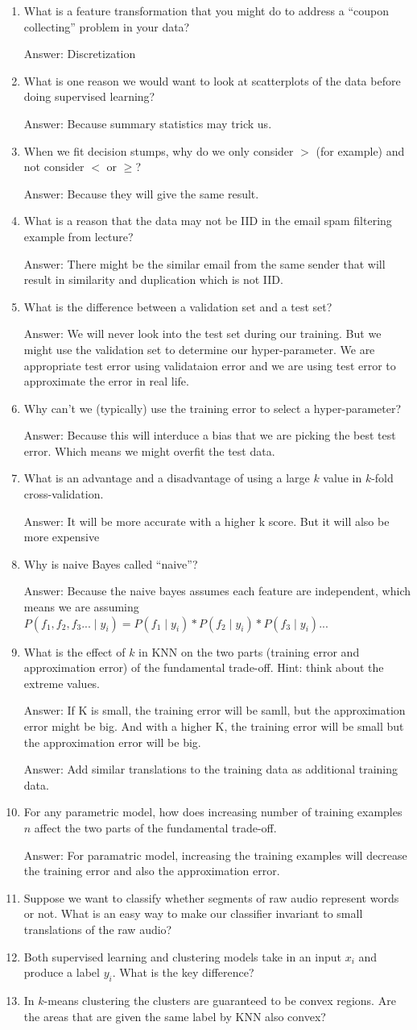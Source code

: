 \documentclass{article}
\def\ans#1{\par\gre{Answer: #1}}
\def\gre#1{{\color{gre}#1}}
\def\cond{\; | \;}
\def\enum#1{\begin{enumerate}#1\end{enumerate}}
\begin{document}
\enum{
 \item What is a feature transformation that you might do to address a ``coupon collecting'' problem in your data? \ans{Discretization}
\item What is one reason we would want to look at scatterplots of the data before doing supervised learning? \ans{Because summary statistics may trick us.}
 \item When we fit decision stumps, why do we only consider $>$ (for example) and not consider $<$ or $\geq$? \ans{Because they will give the same result.}
\item What is a reason that the data may not be IID in the email spam filtering example from lecture? \ans{There might be the similar email from the same sender that will result in similarity and duplication which is not IID.}
\item What is the difference between a validation set and a test set? \ans{We will never look into the test set during our training. But we might use the validation set to determine our hyper-parameter. We are appropriate test error using validataion error and we are using test error to approximate the error in real life.}
\item Why can't we (typically) use the training error to select a hyper-parameter? \ans{Because this will interduce a bias that we are picking the best test error. Which means we might overfit the test data. }
\item What is an advantage and a disadvantage of using a large $k$ value in $k$-fold cross-validation. \ans{It will be more accurate with a higher k score. But it will also be more expensive}
\item Why is  naive Bayes called ``naive''? \ans{Because the naive bayes assumes each feature are independent, which means we are assuming $P(f_1,f_2,f_3 ... \cond y_i) = P(f_1\cond y_i)*P(f_2\cond y_i)*P(f_3\cond y_i)...$}
\item What is the effect of $k$ in KNN on the two parts (training error and approximation error) of the fundamental trade-off. Hint: think about the extreme values. \ans{If K is small, the training error will be samll, but the approximation error might be big. And with a higher K, the training error will be small but the approximation error will be big.} \ans{Add similar translations to the training data as additional training data.}
\item For any parametric model, how does increasing number of training examples $n$ affect the two parts of the fundamental trade-off. \ans{For paramatric model, increasing the training examples will decrease the training error and also the approximation error.}
\item Suppose we want to classify whether segments of raw audio represent words or not. What is an easy way to make our classifier invariant to small translations of the raw audio?
\item Both supervised learning and clustering models take in an input $x_i$ and produce a label $y_i$. What is the key difference?
\item In $k$-means clustering the clusters are guaranteed to be convex regions. Are the areas that are given the same label by KNN also convex?
}
\end{document}
